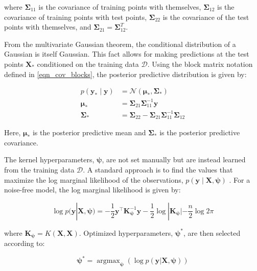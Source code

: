 \documentclass[12pt]{article}
\DeclareMathOperator*{\argmax}{argmax}
\begin{document}
where $\boldsymbol{\Sigma}_{11}$ is the covariance of training points with themselves, $\boldsymbol{\Sigma}_{12}$ is the covariance of training points with test points, $\boldsymbol{\Sigma}_{22}$ is the covariance of the test points with themselves, and $\boldsymbol{\Sigma}_{21} = \boldsymbol{\Sigma}_{12}^T$.

From the multivariate Gaussian theorem, the conditional distribution of a Gaussian is itself Gaussian. This fact allows for making predictions at the test points $\mathbf{X}_*$ conditioned on the training data $\mathcal{D}$. Using the block matrix notation defined in \eqref{eqn_cov_blocks}, the posterior predictive distribution is given by:

\begin{equation}
	\label{eqn_gp_posterior_block}
	\begin{aligned}
		p(\mathbf{y}_* \mid \mathbf{y}) &= \mathcal{N}(\boldsymbol{\mu}_{*}, \boldsymbol{\Sigma}_{*}) \\
		\boldsymbol{\mu}_{*} &= \boldsymbol{\Sigma}_{21} \boldsymbol{\Sigma}_{11}^{-1} \mathbf{y} \\
		\boldsymbol{\Sigma}_{*} &=  \boldsymbol{\Sigma}_{22} - \boldsymbol{\Sigma}_{21} \boldsymbol{\Sigma}_{11}^{-1} \boldsymbol{\Sigma}_{12}
	\end{aligned}
\end{equation}

Here, $\boldsymbol{\mu}_{*}$ is the posterior predictive mean and $\boldsymbol{\Sigma}_{*}$ is the posterior predictive covariance.

The kernel hyperparameters, $\boldsymbol{\psi}$, are not set manually but are instead learned from the training data $\mathcal{D}$. A standard approach is to find the values that maximize the log marginal likelihood of the observations, $p(\mathbf{y} \mid \mathbf{X}, \boldsymbol{\psi})$ \cite{rasmussen2006gaussian}. For a noise-free model, the log marginal likelihood is given by:

\begin{equation}
	\label{MLL}
	\log p(\mathbf{y}|\mathbf{X}, \boldsymbol{\psi}) = -\frac{1}{2} \mathbf{y}^\top \mathbf{K}_{\boldsymbol{\psi}}^{-1} \mathbf{y} - \frac{1}{2}\log|\mathbf{K}_{\boldsymbol{\psi}}| - \frac{n}{2}\log 2\pi
\end{equation}

where $\mathbf{K}_{\boldsymbol{\psi}} = K(\mathbf{X},\mathbf{X})$. Optimized hyperparameters, $\boldsymbol{\psi}^*$, are then selected according to:

\begin{equation}
	\label{maxMLL}
	\boldsymbol{\psi}^* = \argmax_{\boldsymbol{\psi}} \left( \log p(\mathbf{y}|\mathbf{X}, \boldsymbol{\psi}) \right)
\end{equation}
\end{document}
